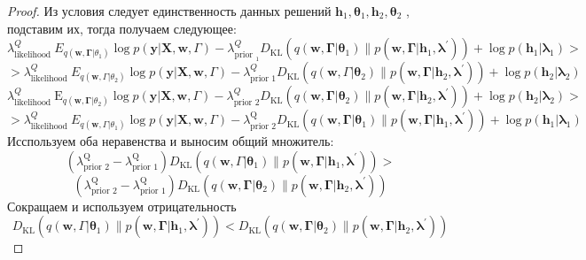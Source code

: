 \documentclass[12pt]{article}
\numberwithin{equation}{section}
\begin{document}
\begin{proof}
		Из условия следует единственность данных решений $\mathbf{h}_{1}, \boldsymbol{\theta}_{1}, \mathbf{h}_{2}, \boldsymbol{\theta}_{2}$ , подставим их, тогда получаем следующее:
		$$\lambda_{\text {likelihood }}^{Q} E_{q\left(\mathbf{w}, \mathbf{\Gamma} | \theta_{1}\right)} \log p(\mathbf{y} | \mathbf{X}, \mathbf{w}, \Gamma)- \lambda_{\text {prior }_{1}}^{Q} D_{\mathrm{KL}}\left(q\left(\mathbf{w}, \mathbf{\Gamma} | \boldsymbol{\theta}_{1}\right) \| p\left(\mathbf{w}, \boldsymbol{\Gamma} | \mathbf{h}_{1}, \boldsymbol{\lambda}^{\prime}\right)\right)+\log p\left(\mathbf{h}_{1} | \boldsymbol{\lambda}_{1}\right)>$$
		$$> \lambda_{\text {likelihood }}^{Q} E_{q\left(\mathbf{w}, \Gamma | \theta_{2}\right)} \log p(\mathbf{y} | \mathbf{X}, \mathbf{w}, \Gamma)-\lambda_{\text {prior } 1}^{Q} D_{\mathrm{KL}}\left(q\left(\mathbf{w}, \Gamma | \boldsymbol{\theta}_{2}\right) \| p\left(\mathbf{w}, \boldsymbol{\Gamma} | \mathbf{h}_{2}, \boldsymbol{\lambda}^{\prime}\right)\right)+\log p\left(\mathbf{h}_{2} | \boldsymbol{\lambda}_{2}\right)$$
		$$ \lambda_{\text {likelihood }}^{Q} \mathrm{E}_{q\left(\mathbf{w}, \mathbf{\Gamma} | \theta_{2}\right)} \log p(\mathbf{y} | \mathbf{X}, \mathbf{w}, \Gamma)
-\lambda_{\text {prior } 2}^{Q} D_{\mathrm{KL}}\left(q\left(\mathbf{w}, \mathbf{\Gamma} | \boldsymbol{\theta}_{2}\right) \| p\left(\mathbf{w}, \boldsymbol{\Gamma} | \mathbf{h}_{2}, \boldsymbol{\lambda}^{\prime}\right)\right)+\log p\left(\mathbf{h}_{2} | \boldsymbol{\lambda}_{2}\right)>
		$$
		$$
		>\lambda_{\text {likelihood }}^{Q} E_{q\left(\mathbf{w}, \Gamma | \theta_{1}\right)} \log p(\mathbf{y} | \mathbf{X}, \mathbf{w}, \Gamma)-\lambda_{\text {prior } 2}^{\mathrm{Q}} D_{\mathrm{KL}}\left(q\left(\mathbf{w}, \mathbf{\Gamma} | \boldsymbol{\theta}_{1}\right) \| p\left(\mathbf{w}, \boldsymbol{\Gamma} | \mathbf{h}_{1}, \boldsymbol{\lambda}^{\prime}\right)\right)+\log p\left(\mathbf{h}_{1} | \boldsymbol{\lambda}_{1}\right)
		$$
		Исспользуем оба неравенства и выносим общий множитель:
		$$\left(\lambda_{\text {prior } 2}^{\mathrm{Q}}-\lambda_{\text {prior } 1}^{\mathrm{Q}}\right) D_{\mathrm{KL}}\left(q\left(\mathbf{w}, \Gamma | \boldsymbol{\theta}_{1}\right) \| p\left(\mathbf{w}, \boldsymbol{\Gamma} | \mathbf{h}_{1}, \boldsymbol{\lambda}^{\prime}\right)\right) >$$
		$$\left(\lambda_{\text {prior } 2}^{\mathrm{Q}}-\lambda_{\text {prior } 1}^{\mathrm{Q}}\right) D_{\mathrm{KL}}\left(q\left(\mathbf{w}, \mathbf{\Gamma} | \boldsymbol{\theta}_{2}\right) \| p\left(\mathbf{w}, \mathbf{\Gamma} | \mathbf{h}_{2}, \boldsymbol{\lambda}^{\prime}\right)\right)$$
		Сокращаем и используем отрицательность
		$$D_{\mathrm{KL}}\left(q\left(\mathbf{w}, \Gamma | \boldsymbol{\theta}_{1}\right) \| p\left(\mathbf{w}, \mathbf{\Gamma} | \mathbf{h}_{1}, \boldsymbol{\lambda}^{\prime}\right)\right)<D_{\mathrm{KL}}\left(q\left(\mathbf{w}, \mathbf{\Gamma} | \boldsymbol{\theta}_{2}\right) \| p\left(\mathbf{w}, \mathbf{\Gamma} | \mathbf{h}_{2}, \boldsymbol{\lambda}^{\prime}\right)\right)$$

	
		\end{proof}
\end{document}
